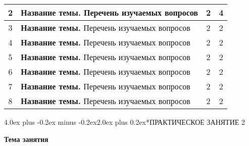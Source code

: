\documentclass[12pt, a4paper]{book}%
\makeatletter
\renewcommand{\section}{\@startsection{section}{1}{1pt}%
{4.0ex plus -0.2ex minus -0.2ex}{2.0ex plus 0.2ex}{\centering\bf}}%
\makeatother
\begin{document}
{{\begin{center}
\begin{longtable}{|c|p{12cm}|c|c|}
         2 & {\bf Название темы.} Перечень изучаемых вопросов    & 2  & 4  \\
         \hline %
         3 & {\bf Название темы.} Перечень изучаемых вопросов    & 2  & 2  \\
         \hline %
         4 & {\bf Название темы.} Перечень изучаемых вопросов    & 2  & 2  \\
         \hline %
         5 & {\bf Название темы.} Перечень изучаемых вопросов    & 2  & 2  \\
         \hline %
         6 & {\bf Название темы.} Перечень изучаемых вопросов    & 2  & 2  \\
         \hline %
         7 & {\bf Название темы.} Перечень изучаемых вопросов    & 2  & 2  \\
         \hline %
         8 & {\bf Название темы.} Перечень изучаемых вопросов    & 2  & 2  \\
         \hline %
      \end{longtable}%
   \end{center}}%




\newpage%
\section*{ПРАКТИЧЕСКОЕ ЗАНЯТИЕ 2}%
 \vspace{-10pt}%
\begin{center}%
   {\bf%
      Тема занятия}
\end{center}%

}
\end{document}
